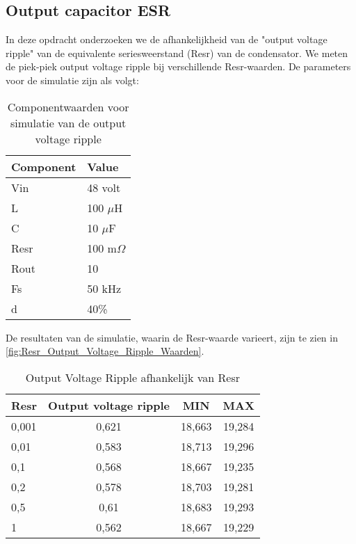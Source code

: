 \subsection{Output capacitor ESR}
In deze opdracht onderzoeken we de afhankelijkheid van de "output voltage ripple" van de equivalente seriesweerstand (Resr) van de condensator. We meten de piek-piek output voltage ripple bij verschillende Resr-waarden. De parameters voor de simulatie zijn als volgt:
\begin{table}[h!]
\centering
\begin{tabular}{|l|l|}
\hline
\textbf{Component} & \textbf{Value} \\
\hline
Vin  & 48 volt \\
L    & 100 $\mu$H \\
C    & 10 $\mu$F \\
Resr & 100 m$\Omega$ \\
Rout & 10 \\
Fs   & 50 kHz \\
d    & 40\% \\
\hline
\end{tabular}
\caption{Componentwaarden voor simulatie van de output voltage ripple}
\label{fig:Componentwaarden voor simulatie2.4}
\end{table}

De resultaten van de simulatie, waarin de Resr-waarde varieert, zijn te zien in \autoref{fig:Resr_Output_Voltage_Ripple_Waarden}.
\begin{table}[h!]
\centering
\begin{tabular}{|l|c|c|c|}
\hline
\textbf{Resr} & \textbf{Output voltage ripple} & \textbf{MIN} & \textbf{MAX} \\
\hline
0,001  & 0,621  & 18,663  & 19,284 \\
0,01   & 0,583  & 18,713  & 19,296 \\
0,1    & 0,568  & 18,667  & 19,235 \\
0,2    & 0,578  & 18,703  & 19,281 \\
0,5    & 0,61   & 18,683  & 19,293 \\
1      & 0,562  & 18,667  & 19,229 \\
\hline
\end{tabular}
\caption{Output Voltage Ripple afhankelijk van Resr}
\label{fig:Resr_Output_Voltage_Ripple_Waarden}
\end{table}

